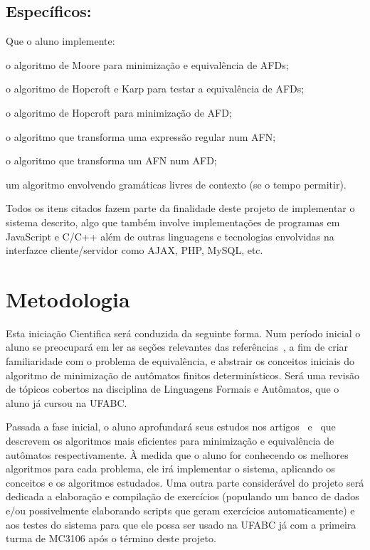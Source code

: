 \documentclass[
	12pt,				%
	openany,
	oneside,
	a4paper,			%
	english,			%
	brazil,				%
	]{abntex2}
\begin{document}
\section {Específicos:}

\noindent Que o aluno implemente:

\begin{alineas}
	\item o algoritmo de Moore para minimização e equivalência de AFDs;
	\item o algoritmo de Hopcroft e Karp para testar a equivalência de AFDs;
	\item o algoritmo de Hopcroft para minimização de AFD;
	\item o algoritmo que transforma uma expressão regular num AFN;
	\item o algoritmo que transforma um AFN num AFD;
	\item um algoritmo envolvendo gramáticas livres de contexto (se o tempo permitir).
\end{alineas}

Todos os itens citados fazem parte da finalidade deste projeto de implementar o sistema descrito, algo que também involve implementações de programas em JavaScript e C/C++ além de outras linguagens e tecnologias envolvidas na interfazce cliente/servidor como AJAX, PHP, MySQL, etc.

\chapter{Metodologia}

Esta iniciação Cientifica será conduzida da seguinte forma. Num período inicial o aluno se preocupará em ler as seções relevantes das referências~\cite{sipser, ullman, linz}, a fim de criar familiaridade com o problema de equivalência, e abstrair os conceitos iniciais do algoritmo de minimização de autômatos finitos determinísticos. Será uma revisão de tópicos cobertos na disciplina de Linguagens Formais e Autômatos, que o aluno já cursou na UFABC.   

Passada a fase inicial, o aluno aprofundará seus estudos nos artigos~\cite{hopcroft} e~\cite{hopcroft_karp} que descrevem os algoritmos mais eficientes para minimização e equivalência de autômatos respectivamente.  À medida que o aluno for conhecendo os melhores algoritmos para cada problema, ele irá implementar o sistema, aplicando os conceitos e os algoritmos estudados. Uma outra parte considerável do projeto será dedicada a elaboração e compilação de exercícios (populando um banco de dados e/ou possivelmente elaborando scripts que geram exercícios automaticamente) e aos testes do sistema para que ele possa ser usado na UFABC já com a primeira turma de MC3106 após o término deste projeto.  
\end{document}
